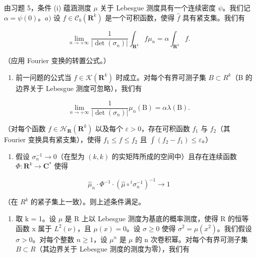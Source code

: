 由习题 5，条件 (i) 蕴涵测度 \(\mu\) 关于 Lebesgue 测度具有一个连续密度 \(\psi\)。我们记 \(\alpha = \psi(0)\)。\(a)\) 设 \(f \in \mathcal{C}_b(\mathbf{R}^k)\) 是一个可积函数，使得 \(\widehat{f}\) 具有紧支集。我们有

\[
\lim _ {n \to + \infty} \frac {1}{| \det (\sigma_ {n}) |} \int_ {\mathbf {R} ^ {k}} f \mu_ {n} = \alpha \int_ {\mathbf {R} ^ {k}} f.
\]

（应用 Fourier 变换的转置公式。）

\begin{enumerate}
\def\labelenumi{\alph{enumi})}
\setcounter{enumi}{1}
\tightlist
\item
  前一问题的公式当 \(f \in \mathcal{K}(\mathbf{R}^{k})\) 时成立。对每个有界可测子集 \(B \subset R^{k}\)（B 的边界关于 Lebesgue 测度可忽略），我们有
\end{enumerate}

\[
\lim _ {n \to + \infty} \frac {1}{| \det (\sigma_ {n}) |} \mu_ {n} (\mathrm{B}) = \alpha \lambda (\mathrm{B}).
\]

（对每个函数 \(f \in \mathcal{H}_{\mathbf{R}}(\mathbf{R}^k)\) 以及每个 \(\varepsilon > 0\)，存在可积函数 \(f_1\) 与 \(f_2\)（其 Fourier 变换具有紧支集），使得 \(f_1 \leqslant f \leqslant f_2\) 且 \(\int (f_2 - f_1) \leqslant \varepsilon\)。）

\begin{enumerate}
\def\labelenumi{\alph{enumi})}
\setcounter{enumi}{2}
\tightlist
\item
  假设 \(\sigma_{n}^{-1}\to 0\)（在型为 \((k,k)\) 的实矩阵所成的空间中）且存在连续函数 \(\Phi \colon \mathbf{R}^k\to \mathbf{C}^*\) 使得
\end{enumerate}

\[
\widehat {\mu} _ {n} \cdot \Phi^ {- 1} \cdot (\widehat {\mu} \circ {} ^ {t} \sigma_ {n} ^ {- 1}) ^ {- 1} \to 1
\]

（在 \(R^{k}\) 的紧子集上一致）。则上述条件满足。

\begin{enumerate}
\def\labelenumi{\alph{enumi})}
\setcounter{enumi}{3}
\tightlist
\item
  取 k = 1。设 \(\mu\) 是 R 上以 Lebesgue 测度为基底的概率测度，使得 R 的恒等函数 x 属于 \(L^{2}(\nu)\)，且 \(\mu(x) = 0\)。设 \(\sigma \geqslant 0\) 使得 \(\sigma^{2} = \mu(x^{2})\)。我们假设 \(\sigma > 0\)。对每个整数 \(n \geqslant 1\)，设 \(\mu^{n}\) 是 \(\mu\) 的 n 次卷积幂。对每个有界可测子集 \(B \subset R\)（其边界关于 Lebesgue 测度的测度为零），我们有
\end{enumerate}

